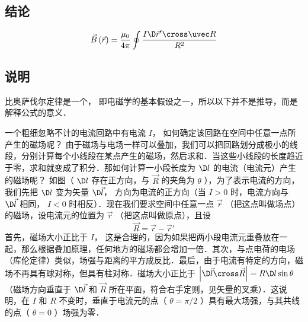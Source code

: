 
\subsection{结论}
\begin{equation}
\vec B\left( {\vec r} \right) = \frac{{{\mu _0}}}{{4\pi }}\oint {\frac{{I\D \vec r' \cross \uvec R}}{{{R^2}}}} 
\end{equation}
\subsection{说明}
比奥萨伐尔定律是一个， 即电磁学的基本假设之一，所以以下并不是推导，而是解释公式的意义．

一个粗细忽略不计的电流回路中有电流 $I$， 如何确定该回路在空间中任意一点所产生的磁场呢？ 由于磁场与电场一样可以叠加，我们可以把回路划分成极小的线段，分别计算每个小线段在某点产生的磁场，然后求和．当这些小线段的长度趋近于零，求和就变成了积分．那如何计算一小段长度为 $\D l$ 的电流（电流元）产生的磁场呢？ 如图（%
 $\D l$ 存在正方向，与 $\vec R$ 的夹角为 $\theta $ ），为了表示电流的方向，我们先把 $\D l$ 变为矢量 $\D \vec l$， 方向为电流的正方向（当 $I > 0$ 时，电流方向与 $\D \vec l$ 相同， $I < 0$ 时相反）．现在我们要求空间中任意一点 $\vec r$ （把这点叫做场点）的磁场，设电流元的位置为 $\vec r$ （把这点叫做原点），且设
\begin{equation}
\vec R = \vec r - \vec r'
\end{equation}
首先，磁场大小正比于 $I$， 这是合理的，因为如果把两小段电流元重叠放在一起，那么根据叠加原理，任何地方的磁场都会增加一倍．其次，与点电荷的电场（库伦定律）类似，场强与距离的平方成反比．最后，由于电流有特定的方向，磁场不再具有球对称，但具有柱对称．磁场大小正比于 $\left| {\D \vec l \cross \vec R} \right| = R \D l \sin \theta $ （磁场方向垂直于 $\D \vec l$ 和 $\vec R$ 所在平面，符合右手定则，见矢量的叉乘）．这说明，在 $I$ 和 $R$ 不变时，垂直于电流元的点（ $\theta  = \pi /2$ ）具有最大场强，与其共线的点（ $\theta  = 0$ ）场强为零．

